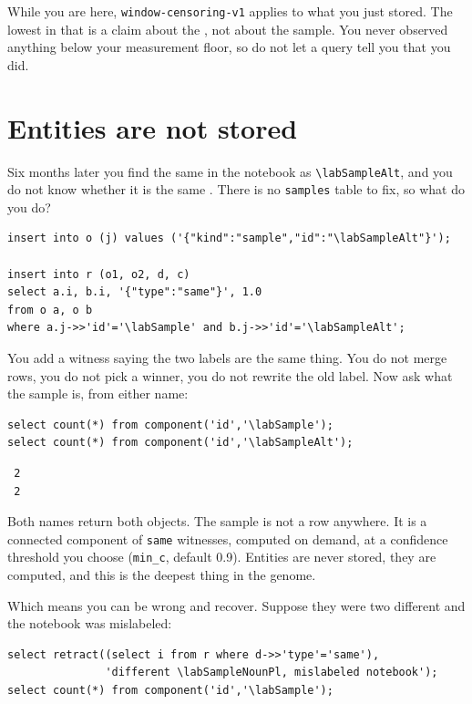 While you are here, \verb|window-censoring-v1| applies to what you just stored. The lowest \labMeasurement{} in that \labRun{} is a claim about the \labRun{}, not about the sample. You never observed anything below your measurement floor, so do not let a query tell you that you did.

\section{Entities are not stored}

Six months later you find the same \labSampleNoun{} in the notebook as \verb|\labSampleAlt|, and you do not know whether it is the same \labSampleNoun{}. There is no \verb|samples| table to fix, so what do you do?

\begin{verbatim}
insert into o (j) values ('{"kind":"sample","id":"\labSampleAlt"}');

insert into r (o1, o2, d, c)
select a.i, b.i, '{"type":"same"}', 1.0
from o a, o b
where a.j->>'id'='\labSample' and b.j->>'id'='\labSampleAlt';
\end{verbatim}

You add a witness saying the two labels are the same thing. You do not merge rows, you do not pick a winner, you do not rewrite the old label. Now ask what the sample is, from either name:

\begin{verbatim}
select count(*) from component('id','\labSample');
select count(*) from component('id','\labSampleAlt');
\end{verbatim}

\begin{verbatim}
 2
 2
\end{verbatim}

Both names return both objects. The sample is not a row anywhere. It is a connected component of \verb|same| witnesses, computed on demand, at a confidence threshold you choose (\verb|min_c|, default 0.9). Entities are never stored, they are computed, and this is the deepest thing in the genome.

Which means you can be wrong and recover. Suppose they were two different \labSampleNounPl and the notebook was mislabeled:

\begin{verbatim}
select retract((select i from r where d->>'type'='same'),
               'different \labSampleNounPl, mislabeled notebook');
select count(*) from component('id','\labSample');
\end{verbatim}

